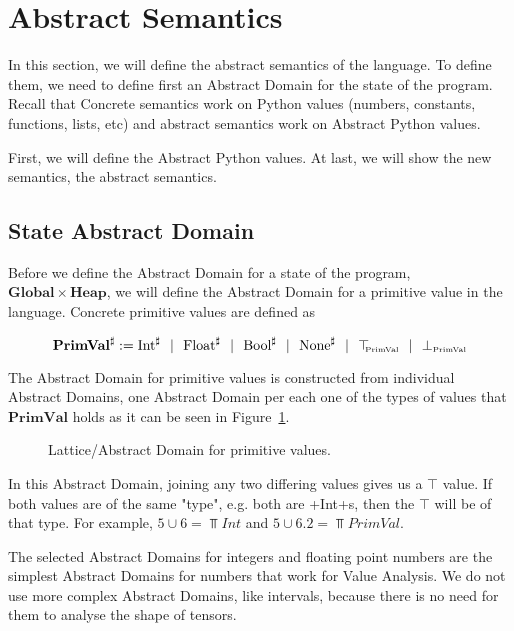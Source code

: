 \section{Abstract Semantics}

In this section, we will define the abstract semantics of the language. To define them, we
need to define first an Abstract Domain for the state of the program. Recall that Concrete
semantics work on Python values (numbers, constants, functions, lists, etc) and abstract
semantics work on Abstract Python values.

First, we will define the Abstract Python values. At last, we will show the new semantics,
the abstract semantics.

\subsection{State Abstract Domain}

Before we define the Abstract Domain for a state of the program,
\(\mathbf{Global} \times \mathbf{Heap}\), we will define the Abstract Domain for a
primitive value in the language. Concrete primitive values are defined as

\[\mathbf{PrimVal}^\sharp := \text{Int}^\sharp ~~|~~ \text{Float}^\sharp ~~|~~ \text{Bool}^\sharp ~~|~~ \text{None}^\sharp ~~|~~ \top_{\hspace{-1mm}{\text{\tiny{PrimVal}}}} ~~|~~ \bot_{\text{\tiny{PrimVal}}} \]

The Abstract Domain for primitive values is constructed from individual Abstract Domains,
one Abstract Domain per each one of the types of values that \(\mathbf{PrimVal}\) holds as
it can be seen in Figure~\ref{latticevals}.

\begin{figure}
  \begin{center}
  
  \end{center}
  \caption{Lattice/Abstract Domain for primitive values.\label{latticevals}}
\end{figure}

In this Abstract Domain, joining any two differing values gives us a $\top$ value. If both
values are of the same "type", e.g. both are \pycode+Int+s, then the $\top$ will be of
that type. For example, $5 \cup 6 = \Top{Int}$ and $5 \cup 6.2 = \Top{PrimVal}$.

The selected Abstract Domains for integers and floating point numbers are the simplest
Abstract Domains for numbers that work for Value Analysis. We do not use more complex
Abstract Domains, like intervals, because there is no need for them to analyse the shape
of tensors.

